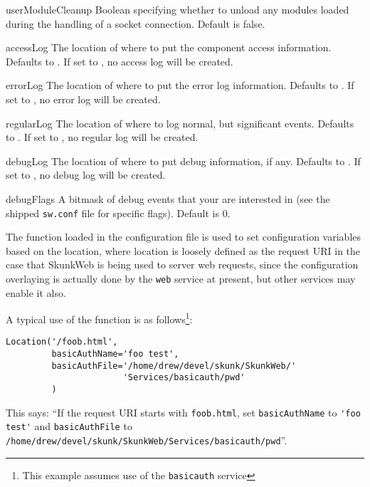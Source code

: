 \documentclass{manual}
\begin{document}
\begin{datadesc}{userModuleCleanup}
Boolean specifying whether to unload any modules loaded during the
handling of a socket connection.  Default is false.
\end{datadesc}
\begin{datadesc}{accessLog} The location of where to put the component access
information.  Defaults to .  If set to
\None, no access log will be created. \nolocation
\end{datadesc}
\begin{datadesc}{errorLog} The location of where to put the error log
information.  Defaults to .  If set to
\None, no error log will be created. \nolocation
\end{datadesc}
\begin{datadesc}{regularLog} The location of where to log normal, but significant
events.  Defaults to .  If set to
\None, no regular log will be created. \nolocation
\end{datadesc}
\begin{datadesc}{debugLog} The location of where to put debug information, if
any.  Defaults to .  If set to
\None, no debug log will be created. \nolocation
\end{datadesc}
\begin{datadesc}{debugFlags} A bitmask of debug events that your are interested
in (see the shipped \texttt{sw.conf} file for specific flags).
Default is 0. 
\end{datadesc}


\label{location}
The \Location{} function loaded in the configuration file is used to
set configuration variables based on the location, where location is
loosely defined as the request URI in the case that SkunkWeb is being
used to server web requests, since the configuration overlaying is
actually done by the \texttt{web} service at present, but other
services may enable it also.

A typical use of the \Location{} function is as follows\footnote{This
example assumes use of the \texttt{basicauth} service}:
\begin{verbatim}
Location('/foob.html',
         basicAuthName='foo test',
         basicAuthFile='/home/drew/devel/skunk/SkunkWeb/'
                       'Services/basicauth/pwd'
         )
\end{verbatim}

This says: ``If the request URI starts with \verb!foob.html!, set
\texttt{basicAuthName} to \verb!'foo test'! and \texttt{basicAuthFile}
to \verb!/home/drew/devel/skunk/SkunkWeb/Services/basicauth/pwd!''.
\end{document}
